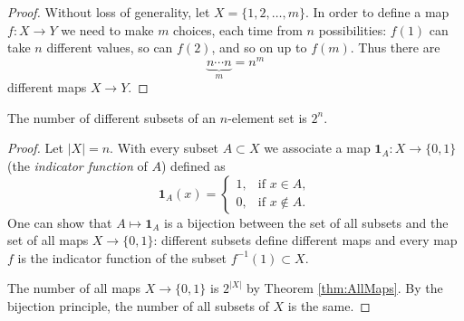 \begin{page}
\setcounter{section}{2}
\setcounter{subsection}{2}
\setcounter{dfn}{2}
\label{portion:36}

\begin{proof}
Without loss of generality, let $X = \{1, 2, \ldots, m\}$.
In order to define a map $f \colon X \to Y$ we need to make $m$ choices, each time from $n$ possibilities:
$f(1)$ can take $n$ different values, so can $f(2)$, and so on up to $f(m)$.
Thus there are
\[
\underbrace{n \cdots n}_{m} = n^m
\]
different maps $X \to Y$.
\end{proof}


\end{page}

\begin{page}
\setcounter{section}{2}
\setcounter{subsection}{2}
\setcounter{dfn}{3}
\label{portion:38}

\begin{thm}
\label{thm:AllSubsets}
The number of different subsets of an $n$-element set is $2^n$.
\end{thm}

\end{page}

\begin{page}
\setcounter{section}{2}
\setcounter{subsection}{2}
\setcounter{dfn}{3}
\label{portion:39}

\begin{proof}
Let $|X| = n$. With every subset $A \subset X$ we associate a map $\mathbf{1}_A \colon X \to \{0,1\}$ (the \emph{indicator function} of $A$) defined as
\[
\mathbf{1}_A(x) =
\begin{cases}
1, &\text{if } x \in A,\\
0, &\text{if } x \notin A.
\end{cases}
\]
One can show that $A \mapsto \mathbf{1}_A$ is a bijection between the set of all subsets and the set of all maps $X \to \{0,1\}$:
different subsets define different maps and every map $f$ is the indicator function of the subset $f^{-1}(1) \subset X$.

The number of all maps $X \to \{0,1\}$ is $2^{|X|}$ by Theorem \ref{thm:AllMaps}.
By the bijection principle, the number of all subsets of $X$ is the same.
\end{proof}


\end{page}

